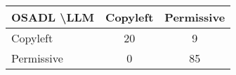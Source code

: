\begin{tabular}{l|cc}\hline
	\textbf{OSADL \textbackslash LLM} & Copyleft & Permissive\\\hline
	Copyleft & 20 & 9\\
	Permissive & 0 & 85\\\hline
\end{tabular}
